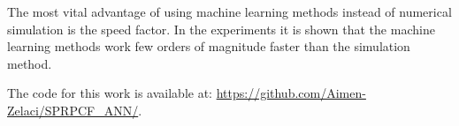 \documentclass[journal]{IEEEtran}
\begin{document}
The most vital advantage of using machine learning methods instead of numerical simulation is the speed factor. In the experiments it is shown that the machine learning methods work few orders of magnitude faster than the simulation method. 


The code for this work is available at: \url{https://github.com/Aimen-Zelaci/SPRPCF_ANN/}.


	
\end{document}
